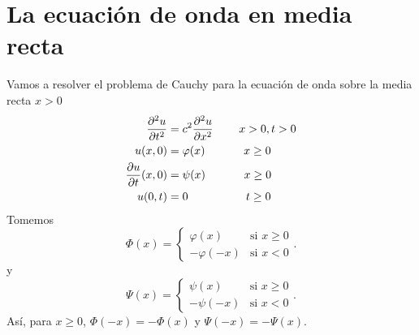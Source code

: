 \documentclass[11pt]{book}
\theoremstyle{plain}
\theoremstyle{definition}
\begin{document}
\section{La ecuación de onda en media recta}
Vamos a resolver el problema de Cauchy para la ecuación de onda sobre la media recta $x>0$
\begin{align*}
    \frac{\partial^2 u}{\partial t^2} &= c^2 \frac{\partial^2 u}{\partial x^2} \hspace{8mm} x > 0, t > 0\\ 
    u(x,0)&= \varphi(x) \hspace{12mm} x \geq 0\\
    \frac{\partial u}{\partial t}(x,0) &= \psi(x) \hspace{12mm} x \geq 0\\
    u(0,t) &= 0 \hspace{18mm} t \geq 0
\end{align*}
Tomemos
\[ 
\Phi(x) = 
\begin{cases} 
\varphi(x) & \text{si } x \geq 0 \\
-\varphi(-x) & \text{si } x < 0 
\end{cases} 
.\]
y
\[ 
\Psi(x) = 
\begin{cases} 
\psi(x) & \text{si } x \geq 0 \\
-\psi(-x)& \text{si } x < 0 
\end{cases} 
.\]
Así, para $x\geq 0$, $\Phi(-x) = - \Phi(x)$ y $\Psi(-x) = - \Psi(x)$.
\end{document}
